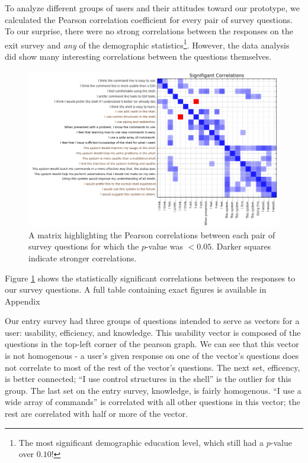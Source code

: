 To analyze different groups of users and their attitudes toward our prototype,
we calculated the Pearson correlation coefficient for every pair of survey
questions. To our surprise, there were no strong correlations between the
responses on the exit survey and \emph{any} of the demographic
statistics\footnote{The most significant demographic education level, which
  still had a $p$-value over $0.10$!}.  However, the data analysis did show many
interesting correlations between the questions themselves.

\begin{figure}[ht]
  \centering
  \includegraphics[width=\textwidth]{figures/stats/sig.png}
  \caption{A matrix highlighting the Pearson correlations between each pair of
    survey questions for which the $p$-value was $< 0.05$. Darker squares
    indicate stronger correlations.}
  \label{fig:pvalplot}
\end{figure}

Figure \ref{fig:pvalplot} shows the statistically significant correlations between
the responses to our survey questions. A full table containing exact figures is
available in Appendix

Our entry survey had three groups of questions intended to serve as vectors for
a user: usability, efficiency, and knowledge. This usability vector is composed
of the questions in the top-left corner of the pearson graph. We can see that
this vector is not homogenous \-- a user's given response on one of the vector's
questions does not correlate to most of the rest of the vector's questions. The
next set, efficency, is better connected; ``I use control structures in the
shell'' is the outlier for this group. The last set on the entry survey,
knowledge, is fairly homogenous. ``I use a wide array of commands'' is correlated
with all other questions in this vector; the rest are correlated with half or
more of the vector.

